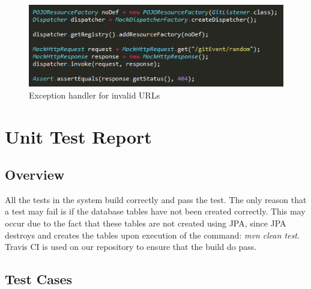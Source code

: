 \documentclass[11pt,a4paper]{article}
\begin{document}
\begin{figure}[H]
	\begin{center}
		\includegraphics[scale=1.0]{../Images/sample2.PNG}
		\caption{Exception handler for invalid URLs}
	\end{center}
\end{figure}


\section{Unit Test Report}
\subsection{Overview}
All the tests in the system build correctly and pass the test. The only reason that a test may fail is if the database tables have not been created correctly. This may occur due to the fact that these tables are not created using JPA, since JPA destroys and creates the tables upon execution of the command: \textit{mvn clean test}. Travis CI is used on our repository to ensure that the build do pass.

\subsection{Test Cases}
\end{document}

